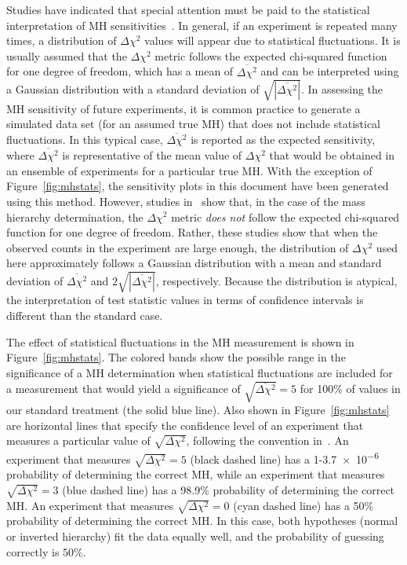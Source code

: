 Studies have indicated that special attention must be paid to the statistical interpretation of MH sensitivities~\cite{Qian:2012zn,Blennow:2013oma}.
In general, if an experiment is repeated many times, a distribution of $\Delta\chi^2$
values will appear due to statistical fluctuations.
It is usually assumed that the $\Delta \chi^2$ metric follows the expected chi-squared
function for one degree of freedom, which has a mean of
$\overline{\Delta\chi^2}$ and can be interpreted using a Gaussian
distribution with a standard deviation of
$\sqrt{|\overline{\Delta\chi^2}|}$.
In assessing the MH sensitivity of future experiments, it is common practice to generate
a simulated data set (for an assumed true MH) that does not include statistical fluctuations. 
In this typical case, $\overline{\Delta\chi^2}$ is reported as the expected sensitivity, 
where $\overline{\Delta\chi^2}$ is representative of the mean value of $\Delta\chi^2$ that 
would be obtained in an ensemble of experiments for a particular true MH.  
With the exception of Figure~\ref{fig:mhstats}, the sensitivity plots
in this document have been generated using this method.
However, studies in~\cite{Qian:2012zn,Blennow:2013oma}
show that, in the case of the mass hierarchy
determination, the $\Delta \chi^2$ metric {\em does not} follow the expected chi-squared
function for one degree of freedom.  Rather, these studies show that
when the observed counts in the experiment are large enough,
the distribution of $\Delta\chi^2$ used here approximately follows
a Gaussian distribution with a
mean and standard deviation of $\overline{\Delta\chi^2}$ and
$2\sqrt{|\overline{\Delta\chi^2}|}$, respectively. Because the distribution is atypical, the interpretation of 
test statistic values in terms of confidence intervals is different than the standard case.

The effect of statistical fluctuations in the MH measurement is shown
in Figure~\ref{fig:mhstats}.  The colored bands show the possible
range in the significance of a MH determination when statistical
fluctuations are included for a measurement that would yield a
significance of $\sqrt{\overline{\Delta\chi^{2}}} = 5$ for 100\% of
\deltacp values in our standard treatment (the solid blue line).  Also
shown in Figure~\ref{fig:mhstats} are horizontal lines that specify
the confidence level of an experiment that measures a particular value
of $\sqrt{\Delta \chi^2}$, following the convention
in~\cite{Qian:2012zn}. An experiment that measures $\sqrt{\Delta
  \chi^2} = 5$ (black dashed line) has a 1-\num{3.7e-6} probability of
determining the correct MH, while an experiment that
measures$\sqrt{\Delta \chi^2} = 3$ (blue dashed line) has a 98.9\%
probability of determining the correct MH. An experiment that measures
$\sqrt{\Delta \chi^2} = 0$ (cyan dashed line) has a 50\% probability
of determining the correct MH.  In this case, both hypotheses (normal
or inverted hierarchy) fit the data equally well, and the probability
of guessing correctly is 50\%.

